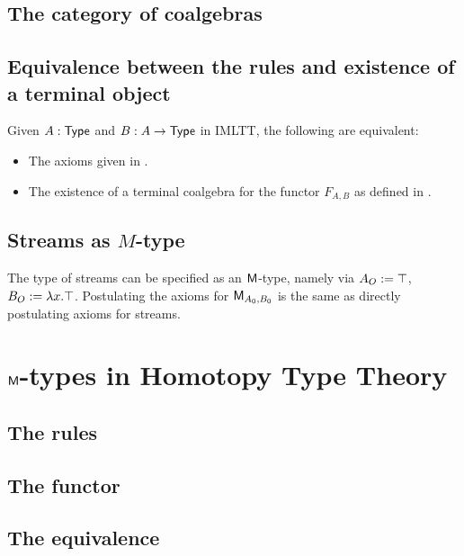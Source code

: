 \documentclass[envcountsame]{llncs}
\begin{document}


\subsection{The category of coalgebras}




\subsection{Equivalence between the rules and existence of a terminal object}

\begin{lemma}
  Given $A:\mathsf{Type}$ and $B:A\to\mathsf{Type}$ in IMLTT, the following are equivalent:
 \begin{itemize}
  \item The axioms given in .
  \item The existence of a terminal coalgebra for the functor $F_{A,B}$ as defined in .
 \end{itemize}

\end{lemma}

\subsection{Streams as $M$-type}

The type of streams can be specified as an $\mathsf{M}$-type, namely via $A_O:= \mathsf{\top}$, $B_O:=\lambda x.\mathsf{\top}$.
Postulating the axioms for $\mathsf{M}_{A_0,B_0}$ is the same as directly postulating axioms for streams.


\section{$\mathsf{M}$-types in Homotopy Type Theory}

\subsection{The rules}
\subsection{The functor}
\subsection{The equivalence}
 
\printbibliography


\appendix
\end{document}
